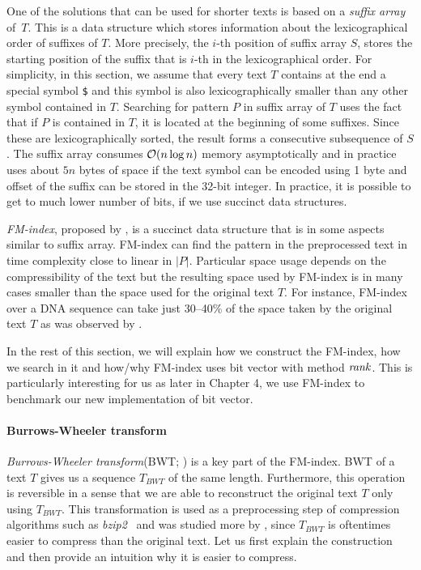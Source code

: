 One of the solutions that can be used for shorter texts is based on a \textit{suffix array} of~$T$.
This is a data structure which stores information about the lexicographical order of suffixes of $T$.
More precisely, the $i$-th position of suffix array $S$, stores the starting position of the suffix
that is $i$-th in the lexicographical order. For simplicity, in this section, we assume that every
text $T$ contains at the end a special symbol {\tt \$} and this symbol is also lexicographically
smaller than any other symbol contained in $T$. Searching for pattern $P$ in suffix array of $T$ uses
the fact that if $P$ is contained in $T$, it is located at the beginning of some suffixes. Since these
are lexicographically sorted, the result forms a consecutive subsequence of $S$. The suffix array consumes
$\mathcal{O}(n\log n)$ memory asymptotically and in practice uses about $5n$ bytes of space if the text symbol
can be encoded using 1 byte and offset of the suffix can be stored in the 32-bit integer. In practice, it
is possible to get to much lower number of bits, if we use succinct data structures.

\textit{FM-index}, proposed by \cite{ferragina2000opportunistic}, is a succinct data structure that
is in some aspects similar to suffix array. FM-index can find the pattern in the preprocessed text
in time complexity close to linear in $|P|$. Particular space usage depends on the compressibility
of the text but the resulting space used by FM-index is in many cases smaller than the space used for
the original text $T$. For instance, FM-index over a DNA sequence can take just 30--40\% of the space
taken by the original text $T$ as was observed by \cite{ferragina2001experimental}. 

In the rest of this section, we will explain how we construct the FM-index, how we search in it
and how/why FM-index uses bit vector with method $\mathit{rank}$. This is particularly interesting for us
as later in Chapter 4, we use FM-index to benchmark our new implementation of bit vector.

\paragraph{Burrows-Wheeler transform}

\textit{Burrows-Wheeler transform}(BWT; \cite{burrows1994block}) is a key
part of the FM-index. BWT of a text $T$ gives us a sequence $\mathit{T_{BWT}}$ of the same
length. Furthermore, this operation is reversible in a sense that we are able to reconstruct
the original text $T$ only using $\mathit{T_{BWT}}$. This transformation is used as a
preprocessing step of compression algorithms such as \textit{bzip2}~\citep{seward1996bzip2}
and was studied more by \cite{manzini2001analysis}, since $T_{BWT}$ is oftentimes easier
to compress than the original text. Let us first explain the construction and then provide
an intuition why it is easier to compress.

